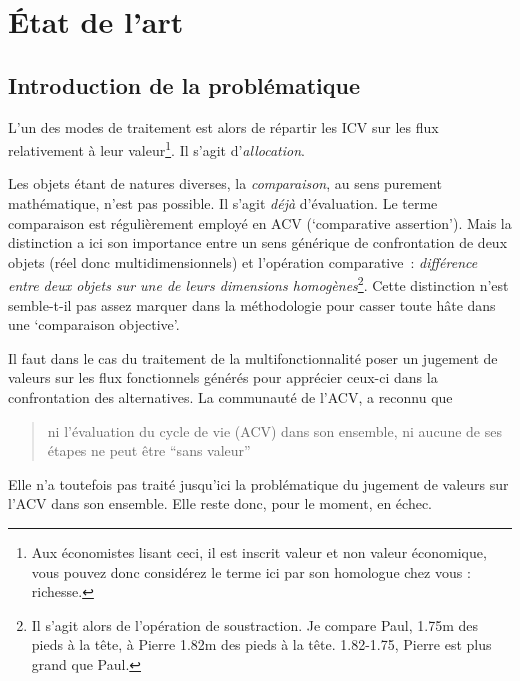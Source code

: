 \section{État de l'art}
\subsection{Introduction de la problématique}

L'un des modes de traitement est alors de répartir les \acrlong{ICV} sur les flux relativement à leur valeur\footnote{Aux économistes lisant ceci, il est inscrit valeur et non valeur économique, vous pouvez donc considérez le terme ici par son homologue chez vous : richesse.}.
Il s'agit d'\emph{allocation}.

Les objets étant de natures diverses, la \emph{comparaison}, au sens purement mathématique, n'est pas possible.
Il s'agit \emph{déjà} d'évaluation.
Le terme comparaison est régulièrement employé en ACV (`comparative assertion').
Mais la distinction a ici son importance entre un sens générique de confrontation de deux objets (réel donc multidimensionnels) et l'opération comparative~: \emph{différence entre deux objets sur une de leurs dimensions homogènes}\footnote{Il s'agit alors de l'opération de soustraction. Je compare Paul, 1.75m des pieds à la tête, à Pierre 1.82m des pieds à la tête. 1.82-1.75, Pierre est plus grand que Paul.}.
Cette distinction n'est semble-t-il pas assez marquer dans la méthodologie pour casser toute hâte dans une `comparaison objective'.

Il faut dans le cas du traitement de la multifonctionnalité poser un jugement de valeurs sur les flux fonctionnels générés pour apprécier ceux-ci dans la confrontation des alternatives.
La communauté de l'ACV, a reconnu que
\blockcquote[traduction]{hertwich_theoretical_2000}{
ni l'évaluation du cycle de vie (ACV) dans son ensemble, ni aucune de ses étapes ne peut être ``sans valeur''
}.
Elle n'a toutefois pas traité jusqu'ici la problématique du jugement de valeurs sur l'ACV dans son ensemble.
Elle reste donc, pour le moment, en échec.

